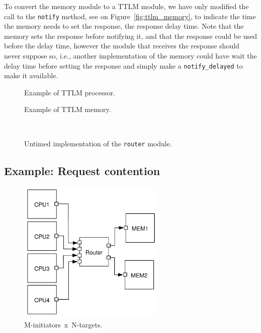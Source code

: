 To convert the memory module to a TTLM module, we have only modified
the call to the \texttt{notify} method, see {\large {}} on
Figure~\ref{fig:ttlm_memory}, to indicate the time the memory needs to
set the response, the response delay time. Note that the memory sets
the response before notifying it, and that the response could be used
before the delay time, however the module that receives the response
should never suppose so, i.e., another implementation of the memory
could have wait the delay time before setting the response and simply
make a \texttt{notify\_delayed} to make it available.

\begin{figure}[p]
  \begin{center}
    
    \caption{\label{fig:ttlm_processor} Example of TTLM processor.}
  \end{center}
\end{figure}

\begin{figure}[p]
\begin{minipage}{\textwidth}
  \begin{center}
    
    \caption{\label{fig:ttlm_memory} Example of TTLM memory.}
  \end{center}
\end{minipage}
\begin{minipage}{\textwidth}
~\vspace{2.5cm}
\end{minipage}
\begin{minipage}{\textwidth}
  \begin{center}
    
    \caption{\label{fig:ttlm_router} Untimed implementation of the
      \texttt{router} module.}
  \end{center}
\end{minipage}
\end{figure}


\subsection{Example: Request contention}
\label{subsec:example_request_contention}

\begin{figure}[h]
  \begin{center}
    \includegraphics[width=7.0cm]{tlm/n_to_m.pdf}
    \caption{\label{fig:n_to_n} M-initiators~x~N-targets.}
  \end{center}
\end{figure}

